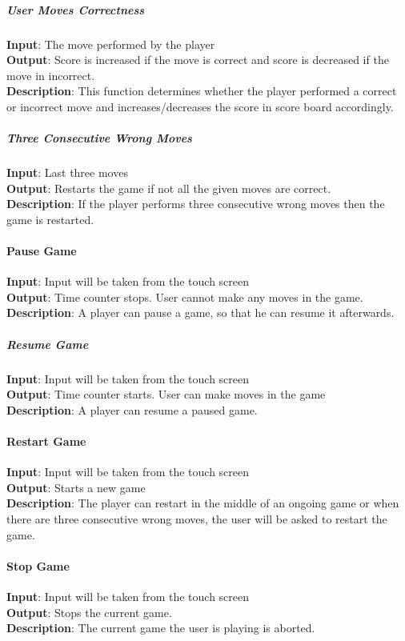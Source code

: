 \documentclass[a4paper,11pt]{article}
\begin{document}
\subparagraph{User Moves Correctness}\hfill \break
\textbf{Input}: The move performed by the player\\
\textbf{Output}: Score is increased if the move is correct and score is decreased if the move in incorrect.\\
\textbf{Description}: This function determines whether the player performed a correct or incorrect move and increases/decreases the score in score board accordingly.

\subparagraph{Three Consecutive Wrong Moves}\hfill \break
\textbf{Input}: Last three moves\\
\textbf{Output}: Restarts the game if not all the given moves are correct.\\
\textbf{Description}: If the player performs three consecutive wrong moves then the game is restarted.

\paragraph{Pause Game}\hfill \break
\textbf{Input}: Input will be taken from the touch screen\\
\textbf{Output}: Time counter stops. User cannot make any moves in the game.\\
\textbf{Description}: A player can pause a game, so that he can resume it afterwards.

\subparagraph{Resume Game}\hfill \break
\textbf{Input}: Input will be taken from the touch screen\\ 
\textbf{Output}: Time counter starts. User can make moves in the game\\
\textbf{Description}: A player can resume a paused game.

\paragraph{Restart Game}\hfill \break
\textbf{Input}: Input will be taken from the touch screen\\
\textbf{Output}: Starts a new game\\
\textbf{Description}: The player can restart in the middle of an ongoing game or when there are three consecutive wrong moves, the user will be asked to restart the game.
\paragraph{Stop Game}\hfill \break
\textbf{Input}: Input will be taken from the touch screen\\
\textbf{Output}: Stops the current game.\\
\textbf{Description}: The current game the user is playing is aborted.
\end{document}
